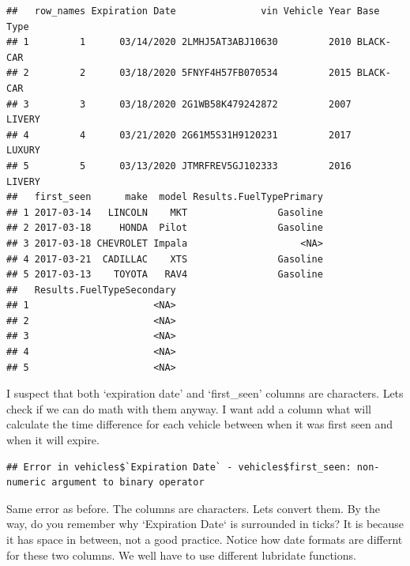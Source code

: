 \documentclass[]{book}
\newenvironment{Shaded}{\begin{snugshade}}{\end{snugshade}}
\newcommand{\CommentTok}[1]{\textcolor[rgb]{0.56,0.35,0.01}{\textit{#1}}}
\newcommand{\DataTypeTok}[1]{\textcolor[rgb]{0.13,0.29,0.53}{#1}}
\newcommand{\NormalTok}[1]{#1}
\newcommand{\OperatorTok}[1]{\textcolor[rgb]{0.81,0.36,0.00}{\textbf{#1}}}
\newcommand{\StringTok}[1]{\textcolor[rgb]{0.31,0.60,0.02}{#1}}
\begin{document}
\begin{verbatim}
##   row_names Expiration Date               vin Vehicle Year Base Type
## 1         1      03/14/2020 2LMHJ5AT3ABJ10630         2010 BLACK-CAR
## 2         2      03/18/2020 5FNYF4H57FB070534         2015 BLACK-CAR
## 3         3      03/18/2020 2G1WB58K479242872         2007    LIVERY
## 4         4      03/21/2020 2G61M5S31H9120231         2017    LUXURY
## 5         5      03/13/2020 JTMRFREV5GJ102333         2016    LIVERY
##   first_seen      make  model Results.FuelTypePrimary
## 1 2017-03-14   LINCOLN    MKT                Gasoline
## 2 2017-03-18     HONDA  Pilot                Gasoline
## 3 2017-03-18 CHEVROLET Impala                    <NA>
## 4 2017-03-21  CADILLAC    XTS                Gasoline
## 5 2017-03-13    TOYOTA   RAV4                Gasoline
##   Results.FuelTypeSecondary
## 1                      <NA>
## 2                      <NA>
## 3                      <NA>
## 4                      <NA>
## 5                      <NA>
\end{verbatim}

I suspect that both `expiration date' and `first\_seen' columns are characters. Lets check if we can do math with them anyway. I want add a column what will calculate the time difference for each vehicle between when it was first seen and when it will expire.

\begin{Shaded}
\end{Shaded}

\begin{verbatim}
## Error in vehicles$`Expiration Date` - vehicles$first_seen: non-numeric argument to binary operator
\end{verbatim}

Same error as before. The columns are characters. Lets convert them. By the way, do you remember why `Expiration Date` is surrounded in ticks? It is because it has space in between, not a good practice. Notice how date formats are differnt for these two columns. We well have to use different lubridate functions.
\end{document}
